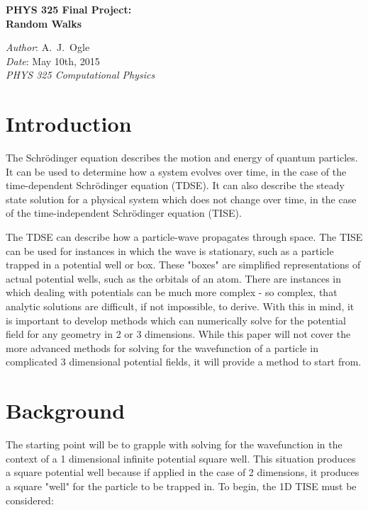 \documentclass[12pt]{article}                  %
\begin{document}

\begin{center}
{\large \bf{PHYS 325 Final Project:\\
Random Walks}}\\
\end{center}
\begin{flushleft}                              %
{\em Author}: A.~J.~Ogle \\                    %
{\em Date}: May 10th, 2015\\
{\em PHYS 325 Computational Physics}\\
\end{flushleft}

\section{Introduction}
	The Schrödinger equation describes the motion and energy of quantum particles. It can be used to determine how a system evolves over time, in the case of the time-dependent Schrödinger equation (TDSE). It can also describe the steady state solution for a physical system which does not change over time, in the case of the time-independent Schrödinger equation (TISE). 
	
The TDSE can describe how a particle-wave propagates through space. The TISE can be used for instances in which the wave is stationary, such as a particle trapped in a potential well or box. These "boxes" are simplified representations of actual potential wells, such as the orbitals of an atom. There are instances in which dealing with potentials can be much more complex - so complex, that analytic solutions are difficult, if not impossible, to derive. With this in mind, it is important to develop methods which can numerically solve for the potential field for any geometry in 2 or 3 dimensions. While this paper will not cover the more advanced methods for solving for the wavefunction of a particle in complicated 3 dimensional potential fields, it will provide a method to start from. 

\section{Background}

The starting point will be to grapple with solving for the wavefunction in the context of a 1 dimensional infinite potential square well. This situation produces a square potential well because if applied in the case of 2 dimensions, it produces a  square "well" for the particle to be trapped in. To begin, the 1D TISE must be considered: 
\end{document}
